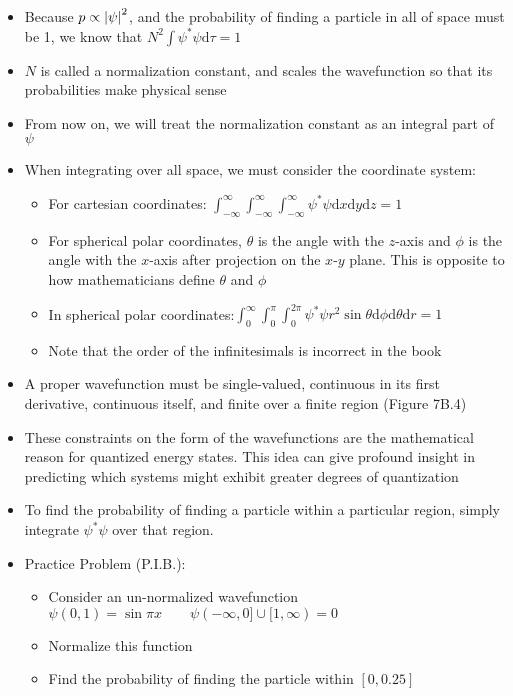 \documentclass[12pt, openany, letterpaper]{memoir}
\begin{document}
\begin{itemize}
	\item Because $p\propto\left| \psi \right|^2$, and the probability of finding a particle in all of space must be 1, we know that $N^2\displaystyle\int\psi^*\psi\mathrm{d}\tau=1$	
	\item $N$ is called a normalization constant, and scales the wavefunction so that its probabilities make physical sense
	\item From now on, we will treat the normalization constant as an integral part of $\psi$
	\item When integrating over all space, we must consider the coordinate system:
	\begin{itemize}
		\item For cartesian coordinates: $\displaystyle\int_{-\infty}^{\infty}\displaystyle\int_{-\infty}^{\infty}\displaystyle\int_{-\infty}^{\infty}\psi^{*}\psi\mathrm{d}x\mathrm{d}y\mathrm{d}z=1$
		\item For spherical polar coordinates, $\theta$ is the angle with the $z$-axis and $\phi$ is the angle with the $x$-axis after projection on the $x$-$y$ plane. This is opposite to how mathematicians define $\theta$ and $\phi$
		\item In spherical polar coordinates:$\displaystyle\int_{0}^{\infty}\displaystyle\int_{0}^{\pi}\displaystyle\int_{0}^{2\pi}\psi^{*}\psi r^2\sin\theta\mathrm{d}\phi\mathrm{d}\theta\mathrm{d}r=1$
		\item Note that the order of the infinitesimals is incorrect in the book
	\end{itemize}
	\item A proper wavefunction must be single-valued, continuous in its first derivative, continuous itself, and finite over a finite region (Figure 7B.4)
	\item These constraints on the form of the wavefunctions are the mathematical reason for quantized energy states. This idea can give profound insight in predicting which systems might exhibit greater degrees of quantization
	\item To find the probability of finding a particle within a particular region, simply integrate $\psi^*\psi$ over that region.
	\item Practice Problem (P.I.B.):
	\begin{itemize}
		\item Consider an un-normalized wavefunction $\psi(0,1) = \sin\pi x\hspace{2em}\psi(-\infty,0]\cup[1,\infty)=0$
		\item Normalize this function
		\item Find the probability of finding the particle within $[0,0.25]$
	\end{itemize}
\end{itemize}
\end{document}
